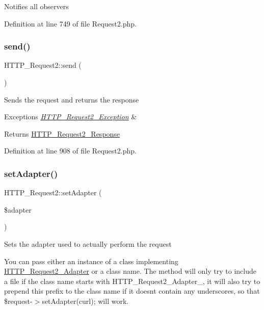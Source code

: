 Notifies all observers 

Definition at line 749 of file Request2.\+php.

\hypertarget{classHTTP__Request2_a0c8dee043682c61c0f1dc1558ea64d36}{}\label{classHTTP__Request2_a0c8dee043682c61c0f1dc1558ea64d36} 
\subsubsection{\texorpdfstring{send()}{send()}}
{\footnotesize\ttfamily H\+T\+T\+P\+\_\+\+Request2\+::send (\begin{DoxyParamCaption}{ }\end{DoxyParamCaption})}

Sends the request and returns the response


\begin{DoxyExceptions}{Exceptions}
{\em \hyperlink{classHTTP__Request2__Exception}{H\+T\+T\+P\+\_\+\+Request2\+\_\+\+Exception}} & \\
\hline
\end{DoxyExceptions}
\begin{DoxyReturn}{Returns}
\hyperlink{classHTTP__Request2__Response}{H\+T\+T\+P\+\_\+\+Request2\+\_\+\+Response} 
\end{DoxyReturn}


Definition at line 908 of file Request2.\+php.

\hypertarget{classHTTP__Request2_a27fadfa673c3317675ab78b5df99264a}{}\label{classHTTP__Request2_a27fadfa673c3317675ab78b5df99264a} 
\subsubsection{\texorpdfstring{set\+Adapter()}{setAdapter()}}
{\footnotesize\ttfamily H\+T\+T\+P\+\_\+\+Request2\+::set\+Adapter (\begin{DoxyParamCaption}\item[{}]{\$adapter }\end{DoxyParamCaption})}

Sets the adapter used to actually perform the request

You can pass either an instance of a class implementing \hyperlink{classHTTP__Request2__Adapter}{H\+T\+T\+P\+\_\+\+Request2\+\_\+\+Adapter} or a class name. The method will only try to include a file if the class name starts with H\+T\+T\+P\+\_\+\+Request2\+\_\+\+Adapter\+\_\+, it will also try to prepend this prefix to the class name if it doesn\textquotesingle{}t contain any underscores, so that {\ttfamily  \$request-\/$>$set\+Adapter(\textquotesingle{}curl\textquotesingle{}); } will work.


